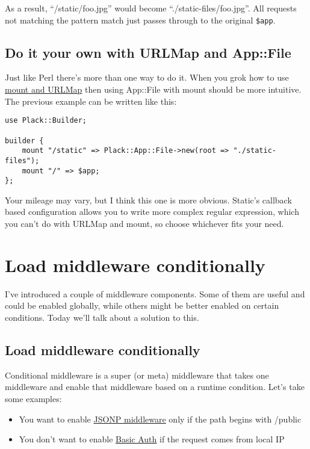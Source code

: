 As a result, ``/static/foo.jpg'' would become
``./static-files/foo.jpg''. All requests not matching the pattern match
just passes through to the original \lstinline!$app!.

\section{Do it your own with URLMap and
App::File}\label{do-it-your-own-with-urlmap-and-appfile}

Just like Perl there's more than one way to do it. When you grok how to
use
\href{http://advent.plackperl.org/2009/12/day-12-maps-multiple-apps-with-mount-and-urlmap.html}{mount
and URLMap} then using App::File with mount should be more intuitive.
The previous example can be written like this:

\begin{lstlisting}
use Plack::Builder;

builder {
    mount "/static" => Plack::App::File->new(root => "./static-files");
    mount "/" => $app;
};
\end{lstlisting}

Your mileage may vary, but I think this one is more obvious. Static's
callback based configuration allows you to write more complex regular
expression, which you can't do with URLMap and mount, so choose
whichever fits your need.

\chapter{Load middleware
conditionally}\label{day-18-load-middleware-conditionally}

I've introduced a couple of middleware components. Some of them are
useful and could be enabled globally, while others might be better
enabled on certain conditions. Today we'll talk about a solution to
this.

\section{Load middleware
conditionally}\label{load-middleware-conditionally}

Conditional middleware is a super (or meta) middleware that takes one
middleware and enable that middleware based on a runtime condition.
Let's take some examples:

\begin{itemize}
\itemsep1pt\parskip0pt
\item
  You want to enable
  \href{http://advent.plackperl.org/2009/12/day-16-adding-jsonp-support-to-your-app.html}{JSONP
  middleware} only if the path begins with /public
\item
  You don't want to enable
  \href{http://advent.plackperl.org/2009/12/day-15-authenticate-your-app-with-middleware.html}{Basic
  Auth} if the request comes from local IP
\end{itemize}

